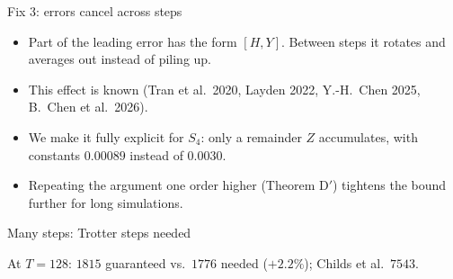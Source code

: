 \documentclass[11pt,aspectratio=169]{beamer}
\begin{document}
\begin{frame}{Fix 3: errors cancel across steps}
\begin{itemize}[<+->]
\item Part of the leading error has the form $[H,Y]$. Between steps it rotates and averages out instead of piling up.
\item This effect is known (Tran et al.\ 2020, Layden 2022, Y.-H.\ Chen 2025, B.\ Chen et al.\ 2026).
\item We make it fully explicit for $S_4$: only a remainder $Z$ accumulates, with constants $0.00089$ instead of $0.0030$.
\item Repeating the argument one order higher (Theorem D$'$) tightens the bound further for long simulations.
\end{itemize}
\end{frame}

\begin{frame}{Many steps: Trotter steps needed}
\centering
{}

{\footnotesize At $T=128$: $1815$ guaranteed vs.\ $1776$ needed ($+2.2\%$); Childs et al.\ $7543$.}
\end{frame}
\end{document}
